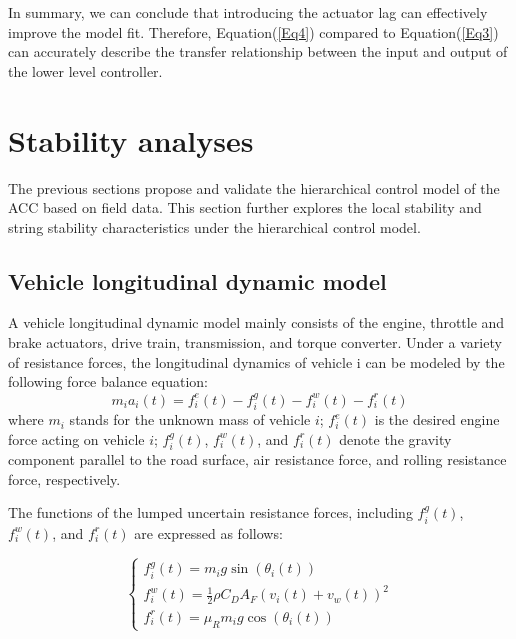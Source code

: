\documentclass[a4paper]{cas-sc}
\begin{document}
In summary, we can conclude that introducing the actuator lag can effectively improve the model fit. Therefore, Equation(\ref{Eq4}) compared to Equation(\ref{Eq3}) can accurately describe the transfer relationship between the input and output of the lower level controller.






\section{Stability analyses}
\label{Section 4}

The previous sections propose and validate the hierarchical control model of the ACC based on field data. This section further explores the local stability and string stability characteristics under the hierarchical control model.

\subsection{Vehicle longitudinal dynamic model}
\label{Section 4.1}

A vehicle longitudinal dynamic model mainly consists of the engine, throttle and brake actuators, drive train, transmission, and torque converter. Under a variety of resistance forces, the longitudinal dynamics of vehicle i can be modeled by the following force balance equation:
\begin{equation}
  m_ia_i(t)=f_i^e(t)-f_i^g(t)-f_i^w(t)-f_i^r(t)
  \label{Eq13}
\end{equation}
where $m_i$ stands for the unknown mass of vehicle $i$; $f_i^e(t)$ is the desired engine force acting on vehicle $i$; $f_i^g(t)$, $f_i^w(t)$, and $f_i^r(t)$ denote the gravity component parallel to the road surface, air resistance force, and rolling resistance force, respectively.

The functions of the lumped uncertain resistance forces, including $f_i^g(t)$, $f_i^w(t)$, and $f_i^r(t)$ are expressed as follows:

\begin{equation}
  \left\{\begin{array}{l}
    f_{i}^{g}(t)=m_{i} g \sin \left(\theta_{i}(t)\right)                        \\
    f_{i}^{w}(t)=\frac{1}{2} \rho C_{D} A_{F}\left(v_{i}(t)+v_{w}(t)\right)^{2} \\
    f_{i}^{r}(t)=\mu_{R} m_{i} g \cos \left(\theta_{i}(t)\right)
  \end{array}\right.
  \label{Eq14}
\end{equation}
\end{document}
